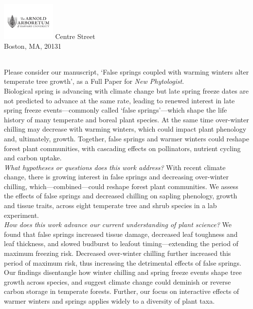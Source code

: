 \documentclass[11pt,a4paper]{article}\usepackage[]{graphicx}\usepackage[]{color}
\begin{document}
\includegraphics[width=0.2\textwidth, right]{AA_logo.jpg}
 Centre Street\\
\noindent Boston, MA, 20131\\

\vspace{1.5ex}


\vspace{3ex}\\
\noindent Please consider our manuscript, `False springs coupled with warming winters alter temperate tree growth', as a Full Paper for \textit{New Phytologist}. \\

\noindent Biological spring is advancing with climate change but late spring freeze dates are not predicted to advance at the same rate, leading to renewed interest in late spring freeze events---commonly called `false springs'---which shape the life history of many temperate and boreal plant species. At the same time over-winter chilling may decrease with warming winters, which could impact plant phenology and, ultimately, growth. Together, false springs and warmer winters could reshape forest plant communities, with cascading effects on pollinators, nutrient cycling and carbon uptake.  \\ %

\noindent \textit{What hypotheses or questions does this work address?} With recent climate change, there is growing interest in false springs and decreasing over-winter chilling, which---combined---could reshape forest plant communities. We assess the effects of false springs and decreased chilling on sapling phenology, growth and tissue traits, across eight temperate tree and shrub species in a lab experiment. \\

\noindent \textit{How does this work advance our current understanding of plant science?} We found that false springs increased tissue damage, decreased leaf toughness and leaf thickness, and slowed budburst to leafout timing---extending the period of maximum freezing risk. Decreased over-winter chilling further increased this period of maximum risk, thus increasing the detrimental effects of false springs. Our findings disentangle how winter chilling and spring freeze events shape tree growth across species, and suggest climate change could deminish or reverse carbon storage in temperate forests. Further, our focus on interactive effects of warmer winters and springs applies widely to a diversity of plant taxa. \\
\end{document}
